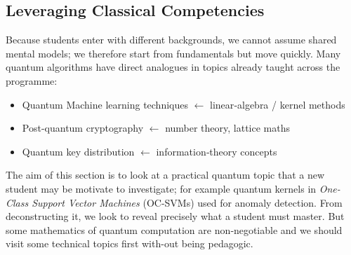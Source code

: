 

\subsection{Leveraging Classical Competencies}



Because students enter with different backgrounds, we cannot assume shared mental models; 
we therefore start from fundamentals but move quickly.
Many quantum algorithms have direct analogues in topics already taught across the programme:

\begin{itemize}
	\item Quantum Machine learning techniques $\leftarrow$ linear‑algebra / kernel methods
	\item Post-quantum cryptography $\leftarrow$ number theory, lattice maths
	\item Quantum key distribution $\leftarrow$ information‑theory concepts
\end{itemize}

The aim of this section is to look at a practical quantum topic that a new student may be motivate to investigate;
for example quantum kernels in \emph{One-Class Support Vector Machines} (OC-SVMs) used for anomaly detection.
From deconstructing it, we look to reveal precisely what a student must master.
But some mathematics of quantum computation are non‑negotiable 
and we should visit some technical topics first with-out being pedagogic.

